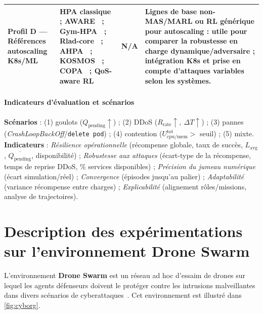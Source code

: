 \begin{table}[h!]
\begin{tabularx}{\textwidth}{p{4.1cm}p{3.4cm}p{2.7cm}X}
    \midrule
    \parbox{4.1cm}{\textbf{Profil D — Références autoscaling K8s/ML}}
                                      & \parbox{3.4cm}{HPA classique ; AWARE~\cite{aware2023} ; Gym-HPA~\cite{gymhpa2022} ; Rlad-core~\cite{Rossi2019} ; AHPA~\cite{Zhou2024} ; KOSMOS~\cite{KOSMOS} ; COPA~\cite{COPA} ; QoS-aware RL~\cite{QoSRL}}
                                      & N/A
                                      & Lignes de base non-MAS/MARL ou RL générique pour autoscaling : utile pour comparer la robustesse en charge dynamique/adversaire ; intégration K8s et prise en compte d’attaques variables selon les systèmes.                                                                                                                             \\
    \bottomrule
  \end{tabularx}
\end{table}

\paragraph{Indicateurs d’évaluation et scénarios}

\textbf{Scénarios} : (1) goulots (\(Q_{\text{pending}}\uparrow\)) ; (2) DDoS (\(R_{\text{rate}}\uparrow,\ \Delta T\uparrow\)) ; (3) pannes (\textit{CrashLoopBackOff}/\texttt{delete pod}) ; (4) contention (\(U_{\text{cpu/mem}}^{\text{tot}}>\) seuil) ; (5) mixte. \textbf{Indicateurs} : \emph{Résilience opérationnelle} (récompense globale, taux de succès, \(L_{\text{avg}}\), \(\overline{Q_{\text{pending}}}\), disponibilité) ; \emph{Robustesse aux attaques} (écart-type de la récompense, temps de reprise DDoS, \% services disponibles) ; \emph{Précision du jumeau numérique} (écart simulation/réel) ; \emph{Convergence} (épisodes jusqu’au palier) ; \emph{Adaptabilité} (variance récompense entre charges) ; \emph{Explicabilité} (alignement rôles/missions, analyse de trajectoires).




\section{Description des expérimentations sur l'environnement Drone Swarm}

L'environnement \textbf{Drone Swarm} est un réseau ad hoc d'essaim de drones sur lequel les agents défenseurs doivent le protéger contre les intrusions malveillantes dans divers scénarios de cyberattaques~\cite{Standen2021}. Cet environnement est illustré dans \autoref{fig:cyborg}.

